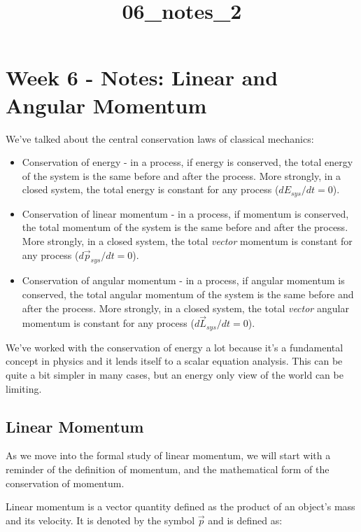 \documentclass[11pt]{article}
\title{06\_notes\_2}
\providecommand{\tightlist}{%
      \setlength{\itemsep}{0pt}\setlength{\parskip}{0pt}}
\begin{document}
    
    \maketitle
    
    

    
    \section{Week 6 - Notes: Linear and Angular
Momentum}\label{week-6---notes-linear-and-angular-momentum}

    We've talked about the central conservation laws of classical mechanics:

\begin{itemize}
\tightlist
\item
  Conservation of energy - in a process, if energy is conserved, the
  total energy of the system is the same before and after the process.
  More strongly, in a closed system, the total energy is constant for
  any process (\(dE_{sys}/dt=0\)).
\item
  Conservation of linear momentum - in a process, if momentum is
  conserved, the total momentum of the system is the same before and
  after the process. More strongly, in a closed system, the total
  \emph{vector} momentum is constant for any process
  (\(d\vec{p}_{sys}/dt=0\)).
\item
  Conservation of angular momentum - in a process, if angular momentum
  is conserved, the total angular momentum of the system is the same
  before and after the process. More strongly, in a closed system, the
  total \emph{vector} angular momentum is constant for any process
  (\(d\vec{L}_{sys}/dt=0\)).
\end{itemize}

We've worked with the conservation of energy a lot because it's a
fundamental concept in physics and it lends itself to a scalar equation
analysis. This can be quite a bit simpler in many cases, but an energy
only view of the world can be limiting.

    \subsection{Linear Momentum}\label{linear-momentum}

As we move into the formal study of linear momentum, we will start with
a reminder of the definition of momentum, and the mathematical form of
the conservation of momentum.

Linear momentum is a vector quantity defined as the product of an
object's mass and its velocity. It is denoted by the symbol \(\vec{p}\)
and is defined as:
\end{document}
